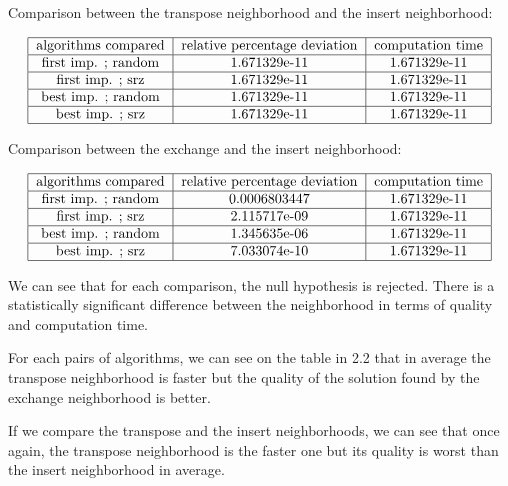 \documentclass{article}
\begin{document}
Comparison between the transpose neighborhood and the insert neighborhood:

\begin{align*}
\begin{tabular} {|c|c|c|c|c|} \hline
    algorithms compared & relative percentage deviation & computation time \\ \hline
    first imp. ; random & 1.671329e-11 & 1.671329e-11 \\ \hline
    first imp. ; srz & 1.671329e-11 & 1.671329e-11 \\ \hline
    best imp. ; random & 1.671329e-11 & 1.671329e-11 \\ \hline
    best imp. ; srz & 1.671329e-11 & 1.671329e-11 \\ \hline
\end{tabular}
\end{align*}

Comparison between the exchange and the insert neighborhood:

\begin{align*}
\begin{tabular} {|c|c|c|c|c|} \hline
    algorithms compared & relative percentage deviation & computation time \\ \hline
    first imp. ; random & 0.0006803447 & 1.671329e-11 \\ \hline
    first imp. ; srz & 2.115717e-09 & 1.671329e-11 \\ \hline
    best imp. ; random & 1.345635e-06 & 1.671329e-11 \\ \hline
    best imp. ; srz & 7.033074e-10 & 1.671329e-11 \\ \hline
\end{tabular}
\end{align*}

We can see that for each comparison, the null hypothesis is rejected.
There is a statistically significant difference between the neighborhood in terms of quality and computation time. \newline

For each pairs of algorithms, we can see on the table in 2.2 that in average the transpose neighborhood is faster but the quality of the solution found by the exchange neighborhood is better. \newline

If we compare the transpose and the insert neighborhoods, we can see that once again, the transpose neighborhood is the faster one but its quality is worst than the insert neighborhood in average. \newline
\end{document}
